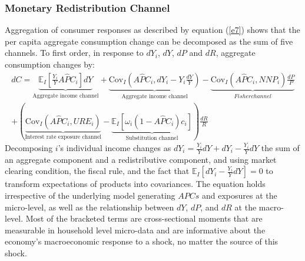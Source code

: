 \documentclass[11pt,letterpaper]{article}
\begin{document}
\subsubsection{Monetary Redistribution Channel}
Aggregation of consumer responses as described by equation (\ref{e7}) shows that the per capita aggregate consumption change can be decomposed as the sum of five channels. To first order, in response to $dY_{i}$, $dY$, $dP$ and $dR$, aggregate consumption changes by: 
\begin{equation}\begin{split}\label{e10}
	dC = \underbrace{\mathbb{E}_{I} \left[\frac{Y_{i}}{Y} A\widehat{P}C_{i}\right] dY}_{\text{Aggregate income channel}} + \underbrace{\mathrm{Cov}_{I} \left(A\widehat{P}C_{i}, dY_{i} - Y_{i} \frac{dY}{Y}\right)}_{\text{Aggregate income channel}} - \underbrace{\mathrm{Cov}_{I} (A\widehat{P}C_{i}, NNP_{i}) \frac{dP}{P}}_{Fisher channel} \\
	+ \left( \underbrace{\mathrm{Cov}_{I} (A\widehat{P}C_{i}, URE_{i})}_{\text{Interest rate exposure channel}} - \underbrace{\mathbb{E}_{I} \left[ \omega_{i} (1 - A\widehat{P}C_{i})c_{i}\right]}_{\text{Substitution channel}}\right) \frac{dR}{R}
\end{split}\end{equation}
Decomposing $i$'s individual income changes as $dY_{i} = \frac{Y_{i}}{Y}dY + dY_{i} - \frac{Y_{i}}{Y}dY$ the sum of an aggregate component and a redistributive component, and using market clearing condition, the fiscal rule, and the fact that $\mathbb{E}_{I}\left[dY_{i} - \frac{Y_{i}}{Y} dY\right] = 0$ to transform expectations of products into covariances. The equation holds irrespective of the underlying model generating $APCs$ and exposures at the micro-level, as well as the relationship between $dY$, $dP$, and $dR$ at the macro-level. Most of the bracketed terms are cross-sectional moments that are measurable in household level micro-data and are informative about the economy's macroeconomic response to a shock, no matter the source of this shock. 
\end{document}

